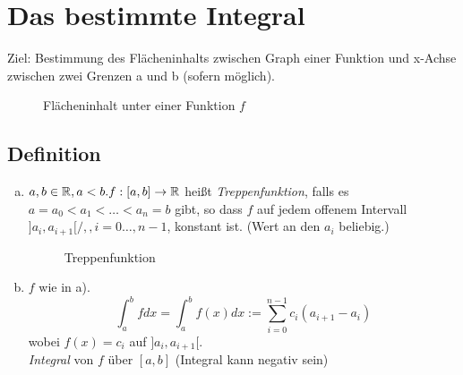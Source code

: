 \section{Das bestimmte Integral}
Ziel: Bestimmung des Flächeninhalts zwischen Graph einer Funktion und x-Achse zwischen zwei Grenzen a und b (sofern möglich).
\begin{figure}[h!t]
	\centering
	\caption{Flächeninhalt unter einer Funktion $f$}
\end{figure}
\subsection{Definition}
\begin{enumerate}[a)]
	\item $a,b \in \mathbb{R}, a<b. f:[a,b] \to \mathbb{R}$ hei\ss t \emph{Treppenfunktion}, falls es $ a = a_0 < a_1 < \ldots < a_n = b$ gibt, so dass $f$ auf jedem offenem Intervall $]a_i,a_{i+1}[/, , i= 0 \ldots, n-1 $, konstant ist. (Wert an den $a_i$ beliebig.)\\
\begin{figure}[h!]
	\centering
	\caption{Treppenfunktion}
\end{figure}
	\item $f$ wie in a).
	\[ \int_a^b fdx = \int_a^b f(x)dx := \sum_{i=0}^{n-1} c_i (a_{i+1} -a_i) \]
	wobei $f(x) = c_i$ auf $]a_i, a_{i+1}[.$\\
	\emph{Integral} von $f$ über $[a,b]$ (Integral kann negativ sein)
\end{enumerate}
